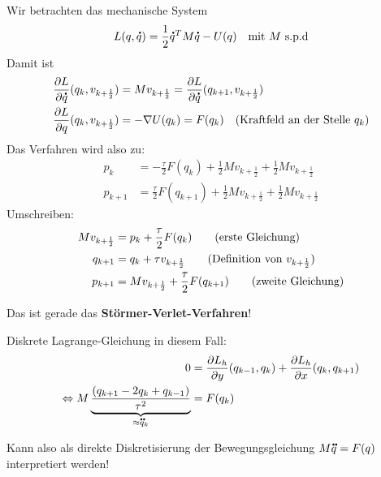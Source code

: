 \documentclass[german]{scrreprt}
\theoremstyle{plain}
\theoremstyle{nonumberplain}
\theoremstyle{nonumberplain}
\theoremstyle{nonumberplain}
\renewcommand*{\dot}[1]{\accentset{\mbox{\large\bfseries .}}{#1}}
\renewcommand*{\ddot}[1]{\accentset{\mbox{\large\bfseries .\hspace{-0.25ex}.}}{#1}}
\begin{document}
Wir betrachten das mechanische System
\begin{equation*}
L (q, \dot{q}) = \frac{1}{2} \dot{q}^T M \dot{q} - U(q) \quad\text{mit $M$ s.p.d}
\end{equation*}
Damit ist
\begin{align*}
\frac{\partial L}{\partial \dot{q}}(q_k, v_{k + \frac{1}{2}}) & = Mv_{k + \frac{1}{2}} = \frac{\partial L}{\partial \dot{q}} (q_{k+1}, v_{k + \frac{1}{2}}) \\
%
\frac{\partial L}{\partial q}(q_k, v_{k + \frac{1}{2}}) & = - \nabla U(q_k) = F(q_k) \quad\text{(Kraftfeld an der Stelle $q_k$)}
\end{align*}
Das Verfahren wird also zu:
\begin{align*}
p_k & = - \frac{\tau}{2} F(q_k) + \frac{1}{2} Mv_{k+\frac{1}{2}}  + \frac{1}{2} Mv_{k+\frac{1}{2}} \\
p_{k + 1} & =  \frac{\tau}{2} F(q_{k+1}) + \frac{1}{2} Mv_{k+\frac{1}{2}}  + \frac{1}{2} Mv_{k+\frac{1}{2}}
\end{align*}
Umschreiben:
\begin{align*}
Mv_{k+\frac{1}{2}} & = p_k + \frac{\tau}{2} F(q_k) \tag{erste Gleichung}\\
q_{k + 1} & = q_k + \tau v_{k+\frac{1}{2}} \tag{Definition von $v_{k+ \frac{1}{2}}$}\\
p_{k + 1} & = Mv_{k+\frac{1}{2}}  + \frac{\tau}{2} F(q_{k+1}) \tag{zweite Gleichung}\\
\end{align*}

Das ist gerade das \textbf{Störmer-Verlet-Verfahren}!

Diskrete Lagrange-Gleichung in diesem Fall:
\begin{align*}
0 & =  \frac{\partial L_h}{\partial y} (q_{k-1}, q_k) + \frac{\partial L_h}{\partial x} (q_k, q_{k+1}) \\
\Leftrightarrow M\underbrace{\frac{(q_{k+1} - 2q_k + q_{k-1})}{\tau^2}}_{\approx \ddot{q}_k} & = F(q_k)
\end{align*}

Kann also als direkte Diskretisierung der Bewegungsgleichung $M \ddot{q} = F(q)$ interpretiert werden!




\end{document}
